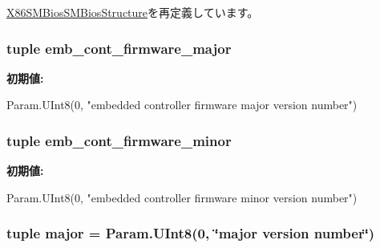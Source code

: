 \hyperlink{classSMBios_1_1X86SMBiosSMBiosStructure_a17da7064bc5c518791f0c891eff05fda}{X86SMBiosSMBiosStructure}を再定義しています。\hypertarget{classSMBios_1_1X86SMBiosBiosInformation_a358b1c1a9734c935d1756618e34b8efe}{
\subsubsection[{emb\_\-cont\_\-firmware\_\-major}]{\setlength{\rightskip}{0pt plus 5cm}tuple {\bf emb\_\-cont\_\-firmware\_\-major}}}
\label{classSMBios_1_1X86SMBiosBiosInformation_a358b1c1a9734c935d1756618e34b8efe}
{\bfseries 初期値:}
\begin{DoxyCode}
Param.UInt8(0,
            "embedded controller firmware major version number")
\end{DoxyCode}
\hypertarget{classSMBios_1_1X86SMBiosBiosInformation_a9c6939a262f00e59c8b7f7b14523169d}{
\subsubsection[{emb\_\-cont\_\-firmware\_\-minor}]{\setlength{\rightskip}{0pt plus 5cm}tuple {\bf emb\_\-cont\_\-firmware\_\-minor}}}
\label{classSMBios_1_1X86SMBiosBiosInformation_a9c6939a262f00e59c8b7f7b14523169d}
{\bfseries 初期値:}
\begin{DoxyCode}
Param.UInt8(0,
            "embedded controller firmware minor version number")
\end{DoxyCode}
\hypertarget{classSMBios_1_1X86SMBiosBiosInformation_a0901fe6d4aa32a2db74b66c2f6cb69cb}{
\subsubsection[{major}]{\setlength{\rightskip}{0pt plus 5cm}tuple {\bf major} = Param.UInt8(0, \char`\"{}major {\bf version} number\char`\"{})}}
